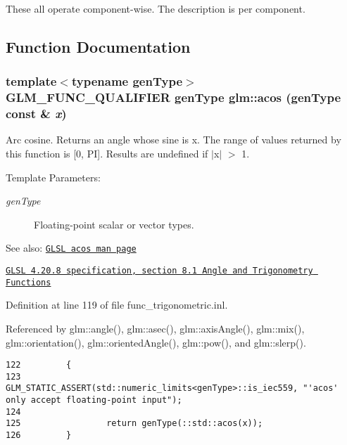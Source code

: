 These all operate component-wise. The description is per component. 

\subsection{Function Documentation}
\hypertarget{group__core__func__trigonometric_gd945cb7263cb202d93ea76aa5d419078}{
\subsubsection[acos]{\setlength{\rightskip}{0pt plus 5cm}template$<$typename genType$>$ GLM\_\-FUNC\_\-QUALIFIER genType glm::acos (genType const \& {\em x})}}
\label{group__core__func__trigonometric_gd945cb7263cb202d93ea76aa5d419078}


Arc cosine. Returns an angle whose sine is x. The range of values returned by this function is \mbox{[}0, PI\mbox{]}. Results are undefined if $|$x$|$ $>$ 1.

\begin{Desc}
\item[Template Parameters:]
\begin{description}
\item[{\em genType}]Floating-point scalar or vector types.\end{description}
\end{Desc}
\begin{Desc}
\item[See also:]\href{http://www.opengl.org/sdk/docs/manglsl/xhtml/acos.xml}{\tt GLSL acos man page} 

\href{http://www.opengl.org/registry/doc/GLSLangSpec.4.20.8.pdf}{\tt GLSL 4.20.8 specification, section 8.1 Angle and Trigonometry Functions} \end{Desc}


Definition at line 119 of file func\_\-trigonometric.inl.

Referenced by glm::angle(), glm::asec(), glm::axisAngle(), glm::mix(), glm::orientation(), glm::orientedAngle(), glm::pow(), and glm::slerp().

\begin{Code}\begin{verbatim}122         {
123                 GLM_STATIC_ASSERT(std::numeric_limits<genType>::is_iec559, "'acos' only accept floating-point input");
124 
125                 return genType(::std::acos(x));
126         }
\end{verbatim}
\end{Code}





